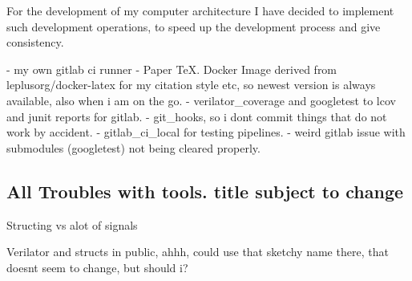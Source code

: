 For the development of my computer architecture I have decided to implement such development operations, to speed up the development process and give consistency. 

- my own gitlab ci runner
- Paper TeX. Docker Image derived from leplusorg/docker-latex for my citation style etc, so newest version is always available, also when i am on the go. 
- verilator\_coverage and googletest to lcov and junit reports for gitlab. 
- git\_hooks, so i dont commit things that do not work by accident. 
- gitlab\_ci\_local for testing pipelines. 
- weird gitlab issue with submodules (googletest) not being cleared properly. 

\subsection{All Troubles with tools. title subject to change}
Structing vs alot of signals

Verilator and structs in public, ahhh, could use that sketchy name there, that doesnt seem to change, but should i?










